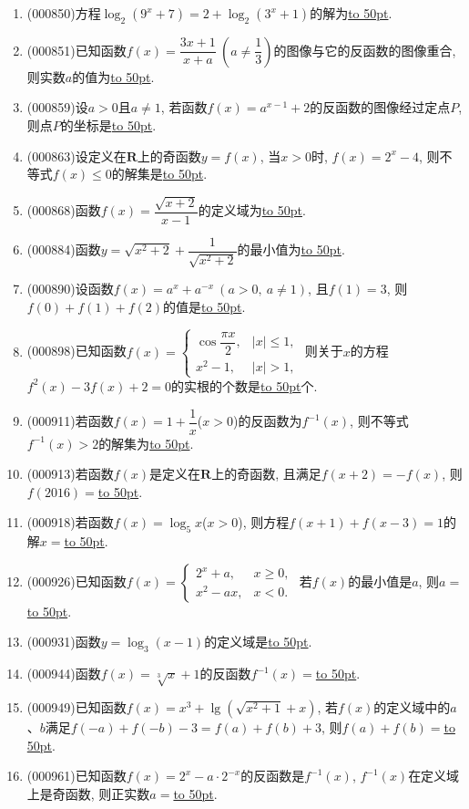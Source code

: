\documentclass[10pt,a4paper]{article}
\newcommand{\blank}[1]{\underline{\hbox to #1pt{}}}
\begin{document}
\begin{enumerate}[1.]
\item {\tiny (000850)}方程$\log_2(9^x+7)=2+\log_2(3^x+1)$的解为\blank{50}.
\item {\tiny (000851)}已知函数$f(x)=\dfrac{3x+1}{x+a}\ (a\ne \dfrac13)$的图像与它的反函数的图像重合, 则实数$a$的值为\blank{50}.
\item {\tiny (000859)}设$a>0$且$a\ne 1$, 若函数$f(x)=a^{x-1}+2$的反函数的图像经过定点$P$, 则点$P$的坐标是\blank{50}.
\item {\tiny (000863)}设定义在$\mathbf{R}$上的奇函数$y=f(x)$, 当$x>0$时, $f(x)=2^x-4$, 则不等式$f(x)\le 0$的解集是\blank{50}.
\item {\tiny (000868)}函数$f(x)=\dfrac{\sqrt{x+2}}{x-1}$的定义域为\blank{50}.
\item {\tiny (000884)}函数$y=\sqrt{x^2+2}+\dfrac1{\sqrt{x^2+2}}$的最小值为\blank{50}.
\item {\tiny (000890)}设函数$f(x)=a^x+a^{-x}  \ (a>0, \ a\ne 1)$, 且$f(1)=3$, 则$f(0)+f(1)+f(2)$的值是\blank{50}.
\item {\tiny (000898)}已知函数$f(x)=\begin{cases} \cos \dfrac{\pi x}2, & |x|\le 1,  \\ x^2-1, & |x|>1,  \end{cases}$ 则关于$x$的方程$f^2(x)-3f(x)+2=0$的实根的个数是\blank{50}个.
\item {\tiny (000911)}若函数$f(x)=1+\dfrac1x$($x>0$)的反函数为$f^{-1}(x)$, 则不等式$f^{-1}(x)>2$的解集为\blank{50}.
\item {\tiny (000913)}若函数$f(x)$是定义在$\mathbf{R}$上的奇函数, 且满足$f(x+2)=-f(x)$, 则$f(2016)=$\blank{50}.
\item {\tiny (000918)}若函数$f(x)=\log _5 x$($x>0$), 则方程$f(x+1)+f(x-3)=1$的解$x=$\blank{50}.
\item {\tiny (000926)}已知函数$f(x)=\begin{cases}2^x +a, & x\ge 0, \\ x^2-ax, & x<0.\end{cases}$ 若$f(x)$的最小值是$a$, 则$a=$\blank{50}.
\item {\tiny (000931)}函数$y=\log_3 (x-1)$的定义域是\blank{50}.
\item {\tiny (000944)}函数$f(x)=\sqrt[3]x+1$的反函数$f^{-1}(x)=$\blank{50}.
\item {\tiny (000949)}已知函数$f(x)={x^3}+\lg (\sqrt{x^2+1}+x)$, 若$f(x)$的定义域中的$a$、$b$满足$f(-a)+f(-b)-3=f(a)+f(b)+3$, 则$f(a)+f(b)=$\blank{50}.
\item {\tiny (000961)}已知函数$f(x)=2^x-a\cdot 2^{-x}$的反函数是$f^{-1}(x)$, $f^{-1}(x)$在定义域上是奇函数, 则正实数$a=$\blank{50}.

\end{enumerate}
\end{document}
